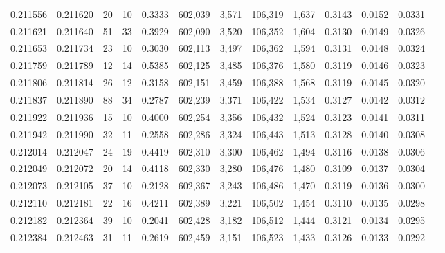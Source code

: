 \begin{tabular}{rrrrrrrrrrrrr}
0.211556 & 0.211620 &    20 &  10 &                                     0.3333 & 602,039 &   3,571 & 106,319 &   1,637 & 0.3143 & 0.0152 & 0.0331 \\
0.211621 & 0.211640 &    51 &  33 &                                     0.3929 & 602,090 &   3,520 & 106,352 &   1,604 & 0.3130 & 0.0149 & 0.0326 \\
0.211653 & 0.211734 &    23 &  10 &                                     0.3030 & 602,113 &   3,497 & 106,362 &   1,594 & 0.3131 & 0.0148 & 0.0324 \\
0.211759 & 0.211789 &    12 &  14 &                                     0.5385 & 602,125 &   3,485 & 106,376 &   1,580 & 0.3119 & 0.0146 & 0.0323 \\
0.211806 & 0.211814 &    26 &  12 &                                     0.3158 & 602,151 &   3,459 & 106,388 &   1,568 & 0.3119 & 0.0145 & 0.0320 \\
0.211837 & 0.211890 &    88 &  34 &                                     0.2787 & 602,239 &   3,371 & 106,422 &   1,534 & 0.3127 & 0.0142 & 0.0312 \\
0.211922 & 0.211936 &    15 &  10 &                                     0.4000 & 602,254 &   3,356 & 106,432 &   1,524 & 0.3123 & 0.0141 & 0.0311 \\
0.211942 & 0.211990 &    32 &  11 &                                     0.2558 & 602,286 &   3,324 & 106,443 &   1,513 & 0.3128 & 0.0140 & 0.0308 \\
0.212014 & 0.212047 &    24 &  19 &                                     0.4419 & 602,310 &   3,300 & 106,462 &   1,494 & 0.3116 & 0.0138 & 0.0306 \\
0.212049 & 0.212072 &    20 &  14 &                                     0.4118 & 602,330 &   3,280 & 106,476 &   1,480 & 0.3109 & 0.0137 & 0.0304 \\
0.212073 & 0.212105 &    37 &  10 &                                     0.2128 & 602,367 &   3,243 & 106,486 &   1,470 & 0.3119 & 0.0136 & 0.0300 \\
0.212110 & 0.212181 &    22 &  16 &                                     0.4211 & 602,389 &   3,221 & 106,502 &   1,454 & 0.3110 & 0.0135 & 0.0298 \\
0.212182 & 0.212364 &    39 &  10 &                                     0.2041 & 602,428 &   3,182 & 106,512 &   1,444 & 0.3121 & 0.0134 & 0.0295 \\
0.212384 & 0.212463 &    31 &  11 &                                     0.2619 & 602,459 &   3,151 & 106,523 &   1,433 & 0.3126 & 0.0133 & 0.0292 \\

\end{tabular}
